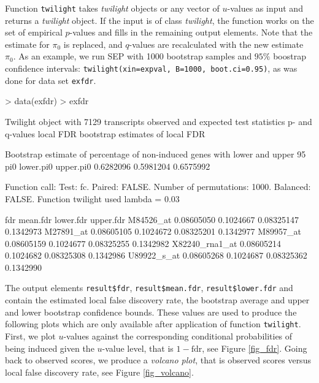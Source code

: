 \documentclass[11pt,a4paper,fleqn]{report}
\newcommand{\Robject}[1]{{\texttt{#1}}}
\newcommand{\Rfunction}[1]{{\texttt{#1}}}
\newcommand{\Rclass}[1]{{\textit{#1}}}
\begin{document}
Function \Rfunction{twilight} takes \Rclass{twilight} objects or any vector of $u$-values as input and returns a \Rclass{twilight} object. If the input is of class \Rclass{twilight}, the function works on the set of empirical $p$-values and fills in the remaining output elements. Note that the estimate for $\pi_0$ is replaced, and $q$-values are recalculated with the new estimate $\pi_0$.
As an example, we run SEP with 1000 bootstrap samples and $95\%$ boostrap confidence intervals: \Rfunction{twilight(xin=expval, B=1000, boot.ci=0.95)}, as was done for data set \Robject{exfdr}.
\begin{Schunk}
\begin{Sinput}
> data(exfdr)
> exfdr
\end{Sinput}
\begin{Soutput}
 Twilight object with
     7129 transcripts
     observed and expected test statistics
     p- and q-values
     local FDR
     bootstrap estimates of local FDR

 Bootstrap estimate of percentage of non-induced
 genes with lower and upper 95% CI:
       pi0 lower.pi0 upper.pi0
 0.6282096 0.5981204 0.6575992

 Function call:
 Test: fc. Paired: FALSE. Number of permutations: 1000. Balanced: FALSE. 
 Function twilight used lambda = 0.03 
\end{Soutput}
\end{Schunk}
\begin{Schunk}
\begin{Soutput}
                      fdr  mean.fdr  lower.fdr upper.fdr
M84526_at      0.08605050 0.1024667 0.08325147 0.1342973
M27891_at      0.08605105 0.1024672 0.08325201 0.1342977
M89957_at      0.08605159 0.1024677 0.08325255 0.1342982
X82240_rna1_at 0.08605214 0.1024682 0.08325308 0.1342986
U89922_s_at    0.08605268 0.1024687 0.08325362 0.1342990
\end{Soutput}
\end{Schunk}
The output elements \Robject{result\$fdr}, \Robject{result\$mean.fdr}, \Robject{result\$lower.fdr} and \linebreak[5] \Robject{result\$upper.fdr} contain the estimated local false discovery rate, the bootstrap average and upper and lower bootstrap confidence bounds. These values are used to produce the following plots which are only available after application of function \Rfunction{twilight}. First, we plot $u$-values against the corresponding conditional probabilities of being induced given the $u$-value level, that is $1-\mbox{fdr}$, see Figure \ref{fig_fdr}. Going back to observed scores, we produce a \textit{volcano plot}, that is observed scores versus local false discovery rate, see Figure \ref{fig_volcano}.
\end{document}
